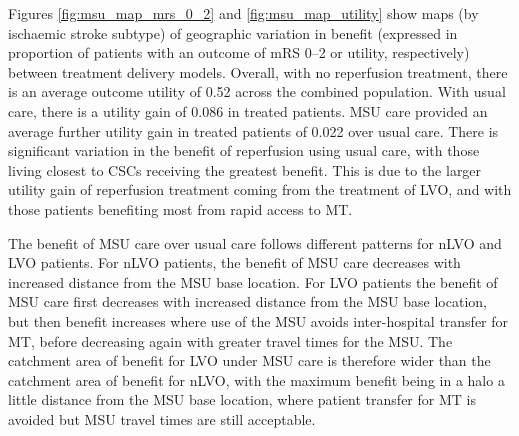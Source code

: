 Figures \ref{fig:msu_map_mrs_0_2} and \ref{fig:msu_map_utility} show maps (by ischaemic stroke subtype) of geographic variation in benefit (expressed in proportion of patients with an outcome of mRS 0--2 or utility, respectively) between treatment delivery models. Overall, with no reperfusion treatment, there is an average outcome utility of 0.52 across the combined population. With usual care, there is a utility gain of 0.086 in treated patients. MSU care provided an average further utility gain in treated patients of 0.022 over usual care. There is significant variation in the benefit of reperfusion using usual care, with those living closest to CSCs receiving the greatest benefit. This is due to the larger utility gain of reperfusion treatment coming from the treatment of LVO, and with those patients benefiting most from rapid access to MT.

The benefit of MSU care over usual care follows different patterns for nLVO and LVO patients. For nLVO patients, the benefit of MSU care decreases with increased distance from the MSU base location. For LVO patients the benefit of MSU care first decreases with increased distance from the MSU base location, but then benefit increases where use of the MSU avoids inter-hospital transfer for MT, before decreasing again with greater travel times for the MSU. The catchment area of benefit for LVO under MSU care is therefore wider than the catchment area of benefit for nLVO, with the maximum benefit being in a halo a little distance from the MSU base location, where patient transfer for MT is avoided but MSU travel times are still acceptable.

